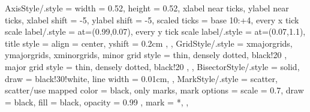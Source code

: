 \pgfplotsset
{
	AxisStyle/.style =
	{
		width					= 0.52\columnwidth,
		height					= 0.52\columnwidth,
		xlabel near ticks,
		ylabel near ticks,
		xlabel shift			= -5,
		ylabel shift			= -5,
		scaled ticks			= base 10:+4,
		every x tick scale label/.style = {at={(0.99,0.07)}},
		every y tick scale label/.style = {at={(0.07,1.1)}},
		title style		=
		{
			align		= center,
			yshift		= 0.2cm
		},
	},
	GridStyle/.style =
	{
		xmajorgrids,
		ymajorgrids,
		xminorgrids,
		minor grid style =
		{
			thin,
			densely dotted,
			black!20
		},
		major grid style =
		{
			thin,
			densely dotted,
			black!20
		},
	},
	BisectorStyle/.style =
	{
		solid,
		draw			= black!30!white,
		line width		= 0.01cm,
	},
	MarkStyle/.style =
	{
		scatter,
		scatter/use mapped color = {black},
		only marks,
		mark options	=
		{
			scale 		= 0.7,
			draw		= black,
			fill		= black,
			opacity		= 0.99
		},
		mark			= *,
	},
}
\def\myseparation{1.7cm}

